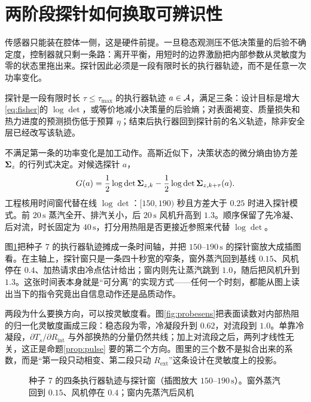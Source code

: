 \section{两阶段探针如何换取可辨识性}
\label{ch:ati}

传感器只能装在腔体一侧，这是硬件前提。一旦稳态观测压不低决策量的后验不确定度，控制器就只剩一条路：离开平衡，用短时的边界激励把内部参数从灵敏度为零的状态里拖出来。探针因此必须是一段有限时长的执行器轨迹，而不是任意一次功率变化。

\begin{definition}[热信息探针]
探针是一段有限时长 \(\tau\le\tau_{\max}\) 的执行器轨迹 \(a\in\mathcal{A}\)，满足三条：设计目标是增大\eqref{eq:fisher}的 \(\log\det\)，或等价地减小决策量的后验熵；对表面褐变、质量损失和热力进度的预测损伤低于预算 \(\eta\)；结束后执行器回到探针前的名义轨迹，除非安全层已经改写该轨迹。
\end{definition}

不满足第一条的功率变化是加工动作。高斯近似下，决策状态的微分熵由协方差 \(\bm{\Sigma}_z\) 的行列式决定。对候选探针 \(a\)，
\begin{equation}
\label{eq:ati}
G(a)=\frac12\log\det\bm{\Sigma}_{z,k}
-\frac12\log\det\bm{\Sigma}_{z,k+\tau}(a).
\end{equation}
工程核用时间窗代替在线 \(\log\det\)：\([150,190)\) 秒且方差大于 \(0.25\) 时进入探针模式。前 \(20\,\mathrm{s}\) 蒸汽全开、排汽关小，后 \(20\,\mathrm{s}\) 风机升高到 \(1.3\)。顺序保留了先冷凝、后对流，时长固定为 \(40\,\mathrm{s}\)，打分用热阻是否更接近参照来代替 \(\log\det\)。

图\ref{fig:probetl}{}把种子 7 的执行器轨迹摊成一条时间轴，并把 \(150\)--\(190\,\mathrm{s}\) 的探针窗放大成插图看。在主轴上，探针窗只是一条四十秒宽的窄条，窗外蒸汽回到基线 \(0.15\)、风机停在 \(0.4\)、加热请求由冷点估计给出；窗内则先让蒸汽跳到 \(1.0\)，随后把风机升到 \(1.3\)。这张时间表本身就是“可分离”的实现方式——任何一个时刻，都能从图上读出当下的指令究竟出自信息动作还是品质动作。

两段为什么要换方向，可以按灵敏度看。图\ref{fig:probesens}{}把表面读数对内部热阻的归一化灵敏度画成三段：稳态段为零，冷凝段升到 \(0.62\)，对流段到 \(1.0\)。单靠冷凝段，\(\partial T_s/\partial R_{\mathrm{int}}\) 与外部换热的分量仍然共线；加上对流段之后，两列才线性无关，这正是命题\ref{prop:pulse} 要的第二个方向。图里的三个数不是拟合出来的系数，而是“第一段只动相变、第二段只动 \(R_{\mathrm{ext}}\)”这条设计在灵敏度上的投影。

\begin{figure}[htbp]
\centering
{}
\caption{种子 7 的四条执行器轨迹与探针窗（插图放大 \(150\)--\(190\,\mathrm{s}\)）。窗外蒸汽回到 \(0.15\)、风机停在 \(0.4\)；窗内先蒸汽后风机}
\label{fig:probetl}
\end{figure}

